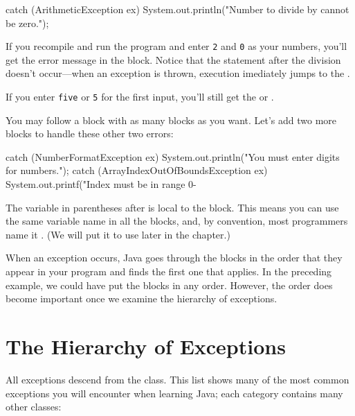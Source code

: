 \begin{code}
catch (ArithmeticException ex) {
    System.out.println("Number to divide by cannot be zero.");
}
\end{code}

If you recompile and run the program and enter \texttt{2} and \texttt{0} as your numbers, you'll get the error message in the  block. Notice that the  statement after the division doesn't occur---when an exception is thrown, execution imediately jumps to the .

If you enter \texttt{five} or \texttt{5} for the first input, you'll still get the  or .
 
You may follow a  block with as many  blocks as you want. Let's add two more  blocks to handle these other two errors:

\begin{code}
catch (NumberFormatException ex) {
    System.out.println("You must enter digits for numbers.");
}
catch (ArrayIndexOutOfBoundsException ex) {
    System.out.printf("Index must be in range 0-%
}
\end{code}

The variable in parentheses after  is local to the  block. This means you can use the same variable name in all the  blocks, and, by convention, most programmers name it . (We will put it to use later in the chapter.)

When an exception occurs, Java goes through the  blocks in the order that they appear in your program and finds the first one that applies. In the preceding example, we could have put the  blocks in any order. However, the order does become important once we examine the hierarchy of exceptions.

\section{The Hierarchy of Exceptions}
All exceptions descend from the  class\footnotemark. This list shows many of the most common exceptions you will encounter when learning Java; each category contains many other classes:


